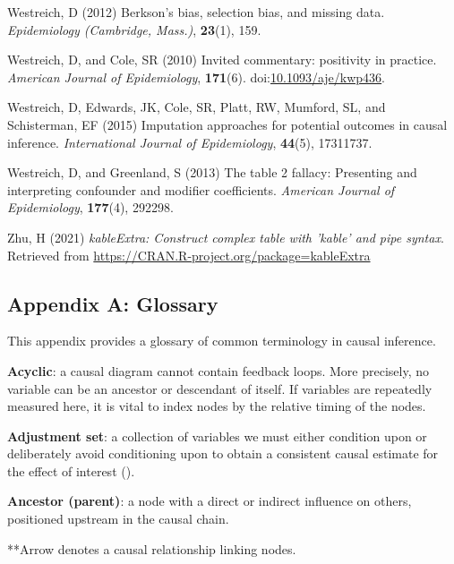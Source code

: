 \documentclass[
  singlecolumn]{article}
\newlength{\cslhangindent}
\newenvironment{CSLReferences}[2] %
 {\begin{list}{}{%
  \setlength{\itemindent}{0pt}
  \setlength{\leftmargin}{0pt}
  \setlength{\parsep}{0pt}
  \ifodd #1
   \setlength{\leftmargin}{\cslhangindent}
   \setlength{\itemindent}{-1\cslhangindent}
  \fi
  \setlength{\itemsep}{#2\baselineskip}}}
 {\end{list}}
\begin{document}
\begin{CSLReferences}{1}{0}
Westreich, D (2012) Berkson's bias, selection bias, and missing data.
\emph{Epidemiology (Cambridge, Mass.)}, \textbf{23}(1), 159.

Westreich, D, and Cole, SR (2010) Invited commentary: positivity in
practice. \emph{American Journal of Epidemiology}, \textbf{171}(6).
doi:\href{https://doi.org/10.1093/aje/kwp436}{10.1093/aje/kwp436}.

Westreich, D, Edwards, JK, Cole, SR, Platt, RW, Mumford, SL, and
Schisterman, EF (2015) Imputation approaches for potential outcomes in
causal inference. \emph{International Journal of Epidemiology},
\textbf{44}(5), 17311737.

Westreich, D, and Greenland, S (2013) The table 2 fallacy: Presenting
and interpreting confounder and modifier coefficients. \emph{American
Journal of Epidemiology}, \textbf{177}(4), 292298.

Zhu, H (2021) \emph{kableExtra: Construct complex table with 'kable' and
pipe syntax}. Retrieved from
\url{https://CRAN.R-project.org/package=kableExtra}

\end{CSLReferences}

\newpage{}

\subsection{Appendix A: Glossary}\label{appendix-a}

This appendix provides a glossary of common terminology in causal
inference.

\textbf{Acyclic}: a causal diagram cannot contain feedback loops. More
precisely, no variable can be an ancestor or descendant of itself. If
variables are repeatedly measured here, it is vital to index nodes by
the relative timing of the nodes.

\textbf{Adjustment set}: a collection of variables we must either
condition upon or deliberately avoid conditioning upon to obtain a
consistent causal estimate for the effect of interest
().

\textbf{Ancestor (parent)}: a node with a direct or indirect influence
on others, positioned upstream in the causal chain.

**Arrow denotes a causal relationship linking nodes.
\end{document}

